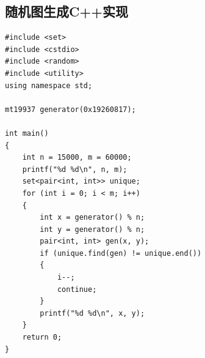 \documentclass{article}
\begin{document}
\subsection{随机图生成C++实现}

\begin{lstlisting}
#include <set>
#include <cstdio>
#include <random>
#include <utility>
using namespace std;

mt19937 generator(0x19260817);

int main()
{
    int n = 15000, m = 60000;
    printf("%d %d\n", n, m);
    set<pair<int, int>> unique;
    for (int i = 0; i < m; i++)
    {
        int x = generator() % n;
        int y = generator() % n;
        pair<int, int> gen(x, y);
        if (unique.find(gen) != unique.end())
        {
            i--;
            continue;
        }
        printf("%d %d\n", x, y);
    }
    return 0;
}
\end{lstlisting}
\end{document}
